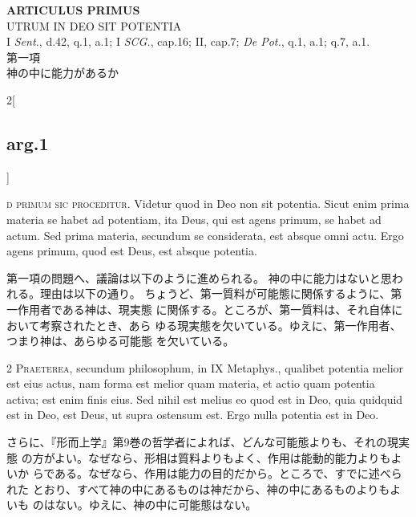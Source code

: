\documentclass[paper=a4paper,fontsize=10pt,jafontsize=9pt,titlepage]{jlreq}
\begin{document}
\newpage
{}
{}
\setcounter{section}{1}
\setcounter{subsection}{0}


\begin{center}
 {\Large {\bfseries ARTICULUS PRIMUS}}\\
 {\large UTRUM IN DEO SIT POTENTIA}\\
 {\footnotesize I {\itshape Sent.}, d.42, q.1, a.1; I {\itshape
 SCG.}, cap.16; II, cap.7; {\itshape De Pot.}, q.1, a.1; q.7, a.1.}\\
 {\Large 第一項\\神の中に能力があるか}
\end{center}

\begin{paracol}{2}[\subsection{arg.1}]

{\Huge}{\scshape d primum sic proceditur}. Videtur quod in
Deo non sit potentia. Sicut enim prima materia se habet ad potentiam,
ita Deus, qui est agens primum, se habet ad actum. Sed prima materia,
secundum se considerata, est absque omni actu. Ergo agens primum, quod
est Deus, est absque potentia.

\switchcolumn

第一項の問題へ、議論は以下のように進められる。
神の中に能力はないと思われる。理由は以下の通り。
ちょうど、第一質料が可能態に関係するように、第一作用者である神は、現実態
 に関係する。ところが、第一質料は、それ自体において考察されたとき、あら
 ゆる現実態を欠いている。ゆえに、第一作用者、つまり神は、あらゆる可能態
 を欠いている。


{\scshape 2 Praeterea}, secundum philosophum, in IX
Metaphys., qualibet potentia melior est eius actus, nam forma est melior
quam materia, et actio quam potentia activa; est enim finis eius. Sed
nihil est melius eo quod est in Deo, quia quidquid est in Deo, est Deus,
ut supra ostensum est. Ergo nulla potentia est in Deo.

\switchcolumn

さらに、『形而上学』第9巻の哲学者によれば、どんな可能態よりも、それの現実態
の方がよい。なぜなら、形相は質料よりもよく、作用は能動的能力よりもよいか
 らである。なぜなら、作用は能力の目的だから。ところで、すでに述べられた
 とおり、すべて神の中にあるものは神だから、神の中にあるものよりもよいも
 のはない。ゆえに、神の中に可能態はない。


\end{paracol}
\end{document}
